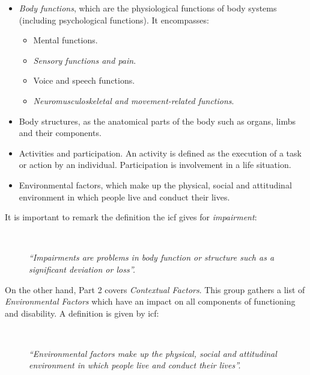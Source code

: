 \begin{itemize}
  \item \textit{Body functions}, which are the physiological functions of body systems 
  (including psychological functions). It encompasses:
    \begin{itemize}
      \item Mental functions.
      \item \textit{Sensory functions and pain}.
      \item Voice and speech functions.
      \item \textit{Neuromusculoskeletal and movement-related functions}.
    \end{itemize}
  \item Body structures, as the anatomical parts of the body such as organs, 
  limbs and their components.
  \item Activities and participation. An activity is defined as the execution of 
  a task or action by an individual. Participation is involvement in a life 
  situation.
  \item Environmental factors, which make up the physical, social and attitudinal
  environment in which people live and conduct their lives.
\end{itemize}

It is important to remark the definition the \ac{icf} gives for \textit{impairment}:

\begin{description}
  \item[] \hfill \\
    \begin{mdframed}[hidealllines=true,backgroundcolor=gray!20]
    \textit{``Impairments are problems in body function or structure such as a 
    significant deviation or loss''.}
    \end{mdframed} 
\end{description}

On the other hand, Part 2 covers \textit{Contextual Factors}. This group gathers 
a list of \textit{Environmental Factors} which have an impact on all components 
of functioning and disability. A definition is given by \ac{icf}:

\begin{description}
  \item[] \hfill \\
    \begin{mdframed}[hidealllines=true,backgroundcolor=gray!20]
    \textit{``Environmental factors make up the physical, social and attitudinal
    environment in which people live and conduct their lives''.}
    \end{mdframed} 
\end{description}

